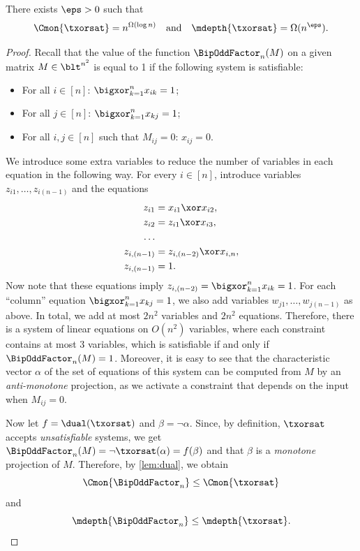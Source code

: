 \documentclass[11pt]{article}
\begin{document}
\begin{theorem}
    \label{thm:xorsat-lb}
    There exists $\eps > 0$
    such that
    $$\Cmon{\txorsat} = n^{\Omega(\log n)}
    \quad \text{and} \quad 
    \mdepth{\txorsat} = \Omega(n^\eps).$$
\end{theorem}
\begin{proof}
    Recall that the
    value of the function
    $\BipOddFactor_n(M)$ on a given matrix
    $M \in \blt^{n^2}$ is equal to 1 if the following system is
    satisfiable:
    \begin{itemize}
        \item For all $i \in [n]$:
            $\bigxor_{k=1}^n x_{ik} = 1$;
        \item For all $j \in [n]$:
            $\bigxor_{k=1}^n x_{kj} = 1$;
        \item For all $i,j \in [n]$ such that $M_{ij} = 0$:
            $x_{ij} = 0$.
    \end{itemize}
    We introduce some extra variables to reduce the number of variables in
    each equation in the following way.
    For every $i \in [n]$,
    introduce variables 
    $z_{i1},\dots,z_{i(n-1)}$
    and the equations
    \begin{align*}
        z_{i1} 
        &= 
        x_{i1} \xor x_{i2},
        \\
        z_{i2} 
        &= 
        z_{i1} \xor x_{i3},
        \\
        \dots
        \\
        z_{i,(n-1)} 
        &= 
        z_{i,(n-2)} \xor x_{i,n},
        \\
        z_{i,(n-1)}
        &= 
        1.
    \end{align*}
    Now note that these equations imply
    $z_{i,(n-2)} = \bigxor_{k=1}^n x_{ik} = 1$.
    For each ``column'' equation
    $\bigxor_{k=1}^n x_{kj} = 1$,
    we also add variables
    $w_{j1},\dots, w_{j(n-1)}$ as above.
    In total, we add
    at most
    $2n^2$ variables
    and
    $2n^2$ equations.
    Therefore, there is a system of linear equations
    on $O(n^2)$ variables, where each constraint contains at most $3$ variables, which is satisfiable
    if and only if
    $\BipOddFactor_n(M)=1$.
    Moreover, it is easy to see that the characteristic vector $\alpha$
    of the set of 
    equations of this system
    can be computed from $M$
    by an \emph{anti-monotone} projection, as we activate a constraint that depends on the input when $M_{ij} = 0$.

    Now let 
    $f = \dual(\txorsat)$ and $\beta = \neg \alpha$. Since, by definition, $\txorsat$ accepts \emph{unsatisfiable} systems,
    we get $\BipOddFactor_n(M) = \neg \txorsat(\alpha) = f(\beta)$ and
    that $\beta$ is a \emph{monotone} projection of $M$.
    Therefore, by \cref{lem:dual},
    we obtain
    \begin{equation*}
        \Cmon{\BipOddFactor_n} \leq \Cmon{\txorsat}
    \end{equation*}
    and
    \begin{equation*}
        \mdepth{\BipOddFactor_n} \leq \mdepth{\txorsat}.
        \qedhere
    \end{equation*}
\end{proof}
\end{document}
